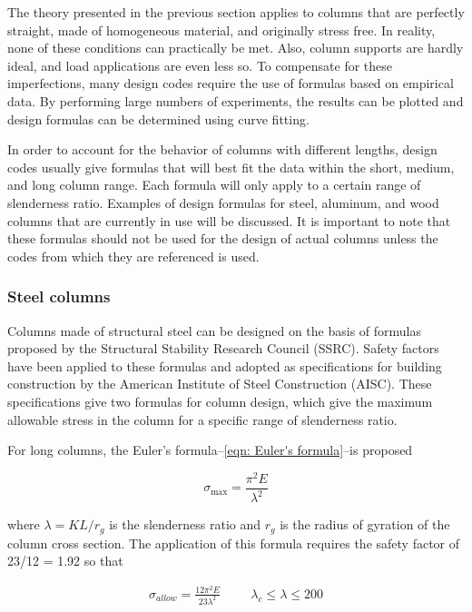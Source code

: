 \documentclass[
10pt,
a4paper,
openany,
svgnames,
]{book}
\begin{document}
The theory presented in the previous section applies to columns that are perfectly straight, made of homogeneous material, and originally stress free. In reality, none of these conditions can practically be met. Also, column supports are hardly ideal, and load applications are even less so. To compensate for these imperfections, many design codes require the use of formulas based on empirical data. By performing large numbers of experiments, the results can be plotted and design formulas can be determined using curve fitting.

In order to account for the behavior of columns with different lengths, design codes usually give formulas that will best fit the data within the short, medium, and long column range. Each formula will only apply to a certain range of slenderness ratio. Examples of design formulas for steel, aluminum, and wood columns that are currently in use will be discussed. It is important to note that these formulas should not be used for the design of actual columns unless the codes from which they are referenced is used.

\subsubsection{Steel columns}

Columns made of structural steel can be designed on the basis of formulas proposed by the Structural Stability Research Council (SSRC). Safety factors have been applied to these formulas and adopted as specifications for building construction by the American Institute of Steel Construction (AISC). These specifications give two formulas for column design, which give the maximum allowable stress in the column for a specific range of slenderness ratio.

For long columns, the Euler’s formula--\cref{eqn: Euler's formula}--is proposed

\[\sigma_{\max} = \frac{\pi^2E}{\lambda^2}\]

where $\lambda = KL/r_g$ is the slenderness ratio and $r_g$ is the radius of gyration of the column cross section. The application of this formula requires the safety factor of 23/12 = 1.92 so that

\begin{align}
  \label{eq: allowable stress in long steel columns}
  \sigma_{allow} = \frac{12\pi^2E}{23\lambda^2} \hspace{1cm} \lambda_c \leqslant \lambda \leqslant 200
\end{align}
\end{document}
